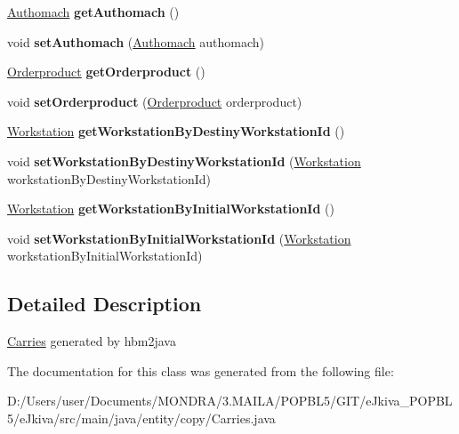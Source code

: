 \begin{DoxyCompactItemize}
\mbox{\hyperlink{classentity_1_1copy_1_1_authomach}{Authomach}} {\bfseries get\+Authomach} ()
\item 
\mbox{\label{classentity_1_1copy_1_1_carries_a649bdb4de46f63fb4b109256593aab95}} 
void {\bfseries set\+Authomach} (\mbox{\hyperlink{classentity_1_1copy_1_1_authomach}{Authomach}} authomach)
\item 
\mbox{\label{classentity_1_1copy_1_1_carries_a81468014f97e67fb9d8bce8f75321d42}} 
\mbox{\hyperlink{classentity_1_1copy_1_1_orderproduct}{Orderproduct}} {\bfseries get\+Orderproduct} ()
\item 
\mbox{\label{classentity_1_1copy_1_1_carries_ab6a366911005a8372e3b64c0155fbfd0}} 
void {\bfseries set\+Orderproduct} (\mbox{\hyperlink{classentity_1_1copy_1_1_orderproduct}{Orderproduct}} orderproduct)
\item 
\mbox{\label{classentity_1_1copy_1_1_carries_a322871db33089a7efbec3b19d3507f4e}} 
\mbox{\hyperlink{classentity_1_1copy_1_1_workstation}{Workstation}} {\bfseries get\+Workstation\+By\+Destiny\+Workstation\+Id} ()
\item 
\mbox{\label{classentity_1_1copy_1_1_carries_a454e92311cac2b97ef80b17effad2405}} 
void {\bfseries set\+Workstation\+By\+Destiny\+Workstation\+Id} (\mbox{\hyperlink{classentity_1_1copy_1_1_workstation}{Workstation}} workstation\+By\+Destiny\+Workstation\+Id)
\item 
\mbox{\label{classentity_1_1copy_1_1_carries_a0e468ba3806ccbe3d466b84d1d0c292f}} 
\mbox{\hyperlink{classentity_1_1copy_1_1_workstation}{Workstation}} {\bfseries get\+Workstation\+By\+Initial\+Workstation\+Id} ()
\item 
\mbox{\label{classentity_1_1copy_1_1_carries_a49fe6fe16889c3ef8d7ab6fbd49bc25f}} 
void {\bfseries set\+Workstation\+By\+Initial\+Workstation\+Id} (\mbox{\hyperlink{classentity_1_1copy_1_1_workstation}{Workstation}} workstation\+By\+Initial\+Workstation\+Id)
\end{DoxyCompactItemize}


\subsection{Detailed Description}
\mbox{\hyperlink{classentity_1_1copy_1_1_carries}{Carries}} generated by hbm2java 

The documentation for this class was generated from the following file\+:\begin{DoxyCompactItemize}
\item 
D\+:/\+Users/user/\+Documents/\+M\+O\+N\+D\+R\+A/3.\+M\+A\+I\+L\+A/\+P\+O\+P\+B\+L5/\+G\+I\+T/e\+Jkiva\+\_\+\+P\+O\+P\+B\+L5/e\+Jkiva/src/main/java/entity/copy/Carries.\+java\end{DoxyCompactItemize}
